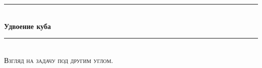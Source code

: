 \documentclass[12pt, letterpaper, oneside]{report}
\begin{document}
\begin{titlepage}

\newcommand{\HRule}{\rule{\linewidth}{0.5mm}} %

\center %
 




\HRule \\[0.8cm]
{ \huge \bfseries Удвоение куба}\\[0.4cm] %
\HRule \\[1.5cm]
\textsc{\large  Взгляд на задачу под другим углом.}\\[0.5cm] 

\begin{minipage}{0.8\textwidth}
\begin{center} \large


\end{center}

\begin{center}

\end{center}

\end{minipage}



\end{titlepage}
\end{document}
